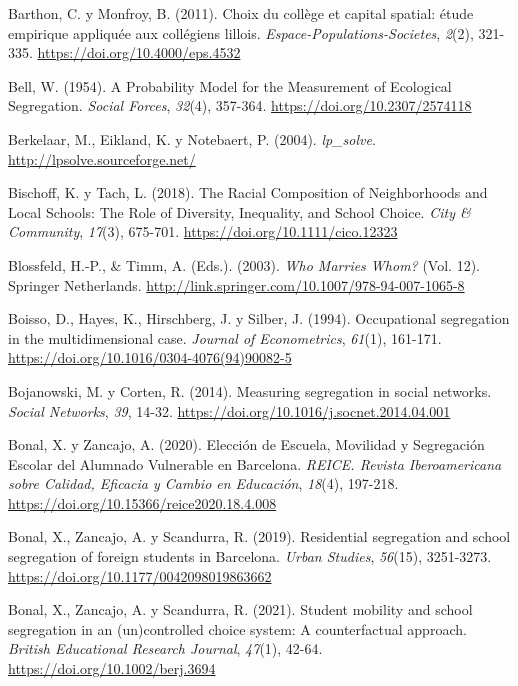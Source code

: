 \documentclass[
  spanish,
  a4paper,%
  chapterprefix=true,%
  DIV=calc,%
  twoside]{scrbook}%
\newlength{\cslhangindent}
\newenvironment{CSLReferences}[2] %
 {\begin{list}{}{%
  \setlength{\itemindent}{0pt}
  \setlength{\leftmargin}{0pt}
  \setlength{\parsep}{0pt}
  \ifodd #1
   \setlength{\leftmargin}{\cslhangindent}
   \setlength{\itemindent}{-1\cslhangindent}
  \fi
  \setlength{\itemsep}{#2\baselineskip}}}
 {\end{list}}
\begin{document}
\begin{CSLReferences}{1}{0}
Barthon, C. y Monfroy, B. (2011). Choix du collège et capital spatial: étude empirique appliquée aux collégiens lillois. \emph{Espace-Populations-Societes}, \emph{2}(2), 321-335. \url{https://doi.org/10.4000/eps.4532}

Bell, W. (1954). A Probability Model for the Measurement of Ecological Segregation. \emph{Social Forces}, \emph{32}(4), 357-364. \url{https://doi.org/10.2307/2574118}

Berkelaar, M., Eikland, K. y Notebaert, P. (2004). \emph{lp{\_}solve}. \url{http://lpsolve.sourceforge.net/}

Bischoff, K. y Tach, L. (2018). The Racial Composition of Neighborhoods and Local Schools: The Role of Diversity, Inequality, and School Choice. \emph{City \& Community}, \emph{17}(3), 675-701. \url{https://doi.org/10.1111/cico.12323}

Blossfeld, H.-P., \& Timm, A. (Eds.). (2003). \emph{Who Marries Whom?} (Vol. 12). Springer Netherlands. \url{http://link.springer.com/10.1007/978-94-007-1065-8}

Boisso, D., Hayes, K., Hirschberg, J. y Silber, J. (1994). Occupational segregation in the multidimensional case. \emph{Journal of Econometrics}, \emph{61}(1), 161-171. \url{https://doi.org/10.1016/0304-4076(94)90082-5}

Bojanowski, M. y Corten, R. (2014). Measuring segregation in social networks. \emph{Social Networks}, \emph{39}, 14-32. \url{https://doi.org/10.1016/j.socnet.2014.04.001}

Bonal, X. y Zancajo, A. (2020). Elección de Escuela, Movilidad y Segregación Escolar del Alumnado Vulnerable en Barcelona. \emph{REICE. Revista Iberoamericana sobre Calidad, Eficacia y Cambio en Educación}, \emph{18}(4), 197-218. \url{https://doi.org/10.15366/reice2020.18.4.008}

Bonal, X., Zancajo, A. y Scandurra, R. (2019). Residential segregation and school segregation of foreign students in Barcelona. \emph{Urban Studies}, \emph{56}(15), 3251-3273. \url{https://doi.org/10.1177/0042098019863662}

Bonal, X., Zancajo, A. y Scandurra, R. (2021). Student mobility and school segregation in an (un)controlled choice system: A counterfactual approach. \emph{British Educational Research Journal}, \emph{47}(1), 42-64. \url{https://doi.org/10.1002/berj.3694}


\end{CSLReferences}
\end{document}
